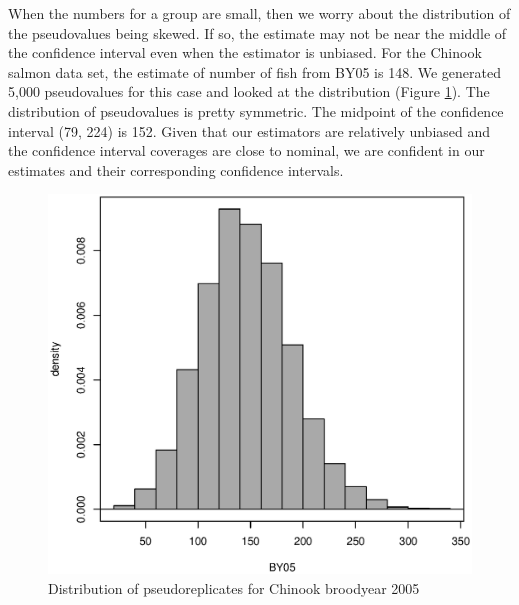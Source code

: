 \documentclass[12pt]{article}
\begin{document}
When the numbers for a group are small, then we worry about the distribution of the pseudovalues being skewed. If so, the estimate may not be near the middle of the confidence interval even when the estimator is unbiased. For the Chinook salmon data set, the estimate of number of fish from BY05 is 148. We generated 5,000 pseudovalues for this case  and looked at the distribution (Figure \ref{fig:CH11BY05}). The distribution of pseudovalues is pretty symmetric. The midpoint of the confidence interval (79, 224) is 152. Given that our estimators are relatively unbiased and the confidence interval coverages are close to nominal, we are confident in our estimates and their corresponding confidence intervals.

\begin{figure}[htbp]
\centering
\includegraphics[width=\textwidth]{./CH11BY05}
\caption{Distribution of pseudoreplicates for Chinook broodyear 2005}
\label{fig:CH11BY05}
\end{figure}
\end{document}
